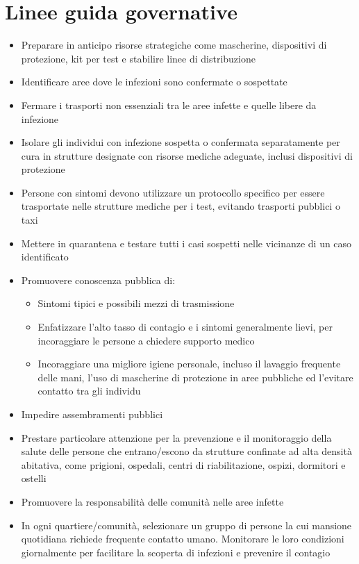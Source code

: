 \documentclass[onecolumn,journal]{IEEEtran}
\begin{document}
\begin{multicols}{2}
\begin{itemize}
\end{itemize}

\vspace{2ex}

\section*{Linee guida governative}
\begin{itemize}
\item Preparare in anticipo risorse strategiche come mascherine, dispositivi di protezione, kit per test e stabilire linee di distribuzione
\item Identificare aree dove le infezioni sono confermate o sospettate
\item Fermare i trasporti non essenziali tra le aree infette e quelle libere da infezione
\item Isolare gli individui con infezione sospetta o confermata separatamente per cura in strutture designate con risorse mediche adeguate, inclusi dispositivi di protezione
\item Persone con sintomi devono utilizzare un protocollo specifico per essere trasportate nelle strutture mediche per i test, evitando trasporti pubblici o taxi
\item Mettere in quarantena e testare tutti i casi sospetti nelle vicinanze di un caso identificato
\item Promuovere conoscenza pubblica di:
  \begin{itemize}
  \item Sintomi tipici e possibili mezzi di trasmissione
  \item Enfatizzare l’alto tasso di contagio e i sintomi generalmente lievi, per incoraggiare le persone a chiedere supporto medico
  \item Incoraggiare una migliore igiene personale, incluso il lavaggio frequente delle mani, l’uso di mascherine di protezione in aree pubbliche ed l’evitare contatto tra gli individu
  \end{itemize}
\item Impedire assembramenti pubblici
\item Prestare particolare attenzione per la prevenzione e il monitoraggio della salute delle persone che entrano/escono da strutture confinate ad alta densità abitativa, come prigioni, ospedali, centri di riabilitazione, ospizi, dormitori e ostelli
\item Promuovere la responsabilità delle comunità nelle aree infette
\item In ogni quartiere/comunità, selezionare un gruppo di persone la cui mansione quotidiana richiede frequente contatto umano. Monitorare le loro condizioni giornalmente per facilitare la scoperta di infezioni e prevenire il contagio

\end{itemize}
\end{multicols}
\end{document}
